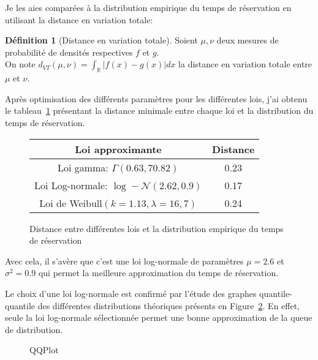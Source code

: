 \documentclass[12pt,a4paper]{article}
\newcommand{\1}[1]{\mathbbm{1}_{\{#1\}} }
\theoremstyle{definition}
\newtheorem{definition}{Définition}
\begin{document}
{Je les aies comparées à la distribution empirique du temps de réservation en utilisant la distance en variation totale:

\begin{definition}[Distance en variation totale]
Soient $\mu,\nu$ deux mesures de probabilité de densités respectives $f$ et $g$.\\
On note $\displaystyle d_{VT}(\mu,\nu) = \int_{\mathbb{R}}|f(x)-g(x)|dx$ la distance en variation totale entre $\mu$ et $\nu$.
\end{definition}

Après optimisation des différents paramètres pour les différentes lois, j'ai obtenu le tableau~\ref{Distance_à_temps_réservation} présentant la distance minimale entre chaque loi et la distribution du temps de réservation.

\begin{figure}[h]
\centering
\begin{tabular}{c|c}
Loi approximante & Distance\\
\hline
Loi gamma: $\Gamma(0.63,70.82)$&  0.23\\
Loi Log-normale: $\log-\mathcal{N}(2.62,0.9)$ & 0.17 \\
Loi de Weibull$(k =1.13  ,\lambda = 16,7)$ & 0.24\\
\end{tabular}
\caption{Distance entre différentes lois et la distribution empirique du temps de réservation}
\label{Distance_à_temps_réservation}
\end{figure}

Avec cela, il s'avère que c'est une loi log-normale de paramètres $\mu = 2.6$ et $\sigma^2=0.9$ qui permet la meilleure approximation du temps de réservation.

Le choix d'une loi log-normale est confirmé par l'étude des graphes quantile-quantile des différentes distributions théoriques présents en Figure~\ref{Qplot}. En effet, seule la loi log-normale sélectionnée permet une bonne approximation de la queue de distribution.



\begin{figure}[h]
\centering
{}
\caption{QQPlot}
\label{Qplot}


\end{figure}}
\end{document}
